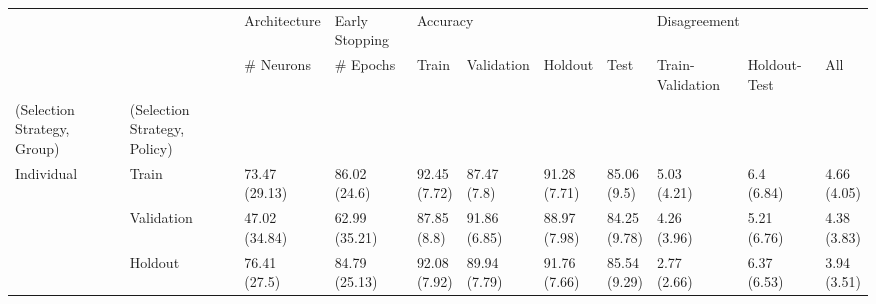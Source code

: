 \begin{table}
\centering
\label{tab:high_generalization_performance}
\begin{tabular}{lllllllllll}
\toprule
       &     &   Architecture & Early Stopping & \multicolumn{4}{l}{Accuracy} & \multicolumn{3}{l}{Disagreement} \\
       &     &      \# Neurons &       \# Epochs &          Train &    Validation &       Holdout &          Test & Train-Validation & Holdout-Test &          All \\
(Selection Strategy, Group) & (Selection Strategy, Policy) &                &                &                &               &               &               &                  &              &              \\
\midrule
Individual & Train &  \makecell{73.47\\(29.13)} &   \makecell{86.02\\(24.6)} &   \makecell{92.45\\(7.72)} &   \makecell{87.47\\(7.8)} &  \makecell{91.28\\(7.71)} &   \makecell{85.06\\(9.5)} &      \makecell{5.03\\(4.21)} &   \makecell{6.4\\(6.84)} &  \makecell{4.66\\(4.05)} \\
       & Validation &  \makecell{47.02\\(34.84)} &  \makecell{62.99\\(35.21)} &    \makecell{87.85\\(8.8)} &  \makecell{91.86\\(6.85)} &  \makecell{88.97\\(7.98)} &  \makecell{84.25\\(9.78)} &      \makecell{4.26\\(3.96)} &  \makecell{5.21\\(6.76)} &  \makecell{4.38\\(3.83)} \\
       & Holdout &   \makecell{76.41\\(27.5)} &  \makecell{84.79\\(25.13)} &   \makecell{92.08\\(7.92)} &  \makecell{89.94\\(7.79)} &  \makecell{91.76\\(7.66)} &  \makecell{85.54\\(9.29)} &      \makecell{2.77\\(2.66)} &  \makecell{6.37\\(6.53)} &  \makecell{3.94\\(3.51)} \\

\end{tabular}
\end{table}

